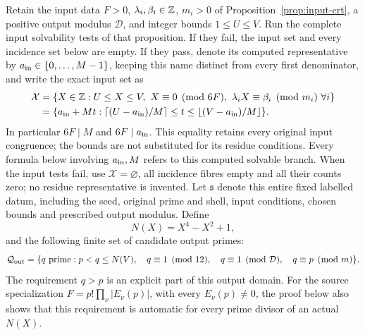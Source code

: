 Retain the input data \(F>0\), \(\lambda_i,\beta_i\in\mathbb Z\),
\(m_i>0\) of Proposition~\ref{prop:input-crt}, a positive output
modulus \(\mathcal D\), and integer bounds \(1\le U\le V\).
Run the complete input solvability tests of that proposition.
If they fail, the input set and every incidence set below are empty.
If they pass, denote its computed representative by
\(a_{\rm in}\in\{0,\ldots,M-1\}\), keeping this name distinct
from every first denominator, and write the exact input set as
\begin{align*}
 \mathcal X
 &=\{X\in\mathbb Z:U\le X\le V,\ X\equiv0\pmod{6F},\
                  \lambda_iX\equiv\beta_i\pmod{m_i}\ \forall i\}\\
 &=\{a_{\rm in}+Mt:
       \lceil(U-a_{\rm in})/M\rceil\le t\le
       \lfloor(V-a_{\rm in})/M\rfloor\}.
\end{align*}
In particular \(6F\mid M\) and \(6F\mid a_{\rm in}\).
This equality retains every original input congruence; the bounds
are not substituted for its residue conditions.
Every formula below involving \(a_{\rm in},M\) refers to this
computed solvable branch.  When the input tests fail, use
\(\mathcal X=\varnothing\), all incidence fibres empty and all
their counts zero; no residue representative is invented.
Let \(\mathfrak s\) denote this entire fixed labelled datum,
including the seed, original prime and shell, input conditions,
chosen bounds and prescribed output modulus.  Define
\[
 N(X)=X^4-X^2+1,
\]
and the following finite set of candidate output primes:
\[
 \mathcal Q_{\rm out}=
 \{q\text{ prime}:p<q\le N(V),\quad
       q\equiv1\pmod{12},\quad q\equiv1\pmod{\mathcal D},\quad
       q\equiv p\pmod m\}.
\]
The requirement \(q>p\) is an explicit part of this output domain.
For the source specialization
\(F=p!\prod_\nu|E_\nu(p)|\), with every \(E_\nu(p)\ne0\),
the proof below also shows that this requirement is automatic
for every prime divisor of an actual \(N(X)\).

